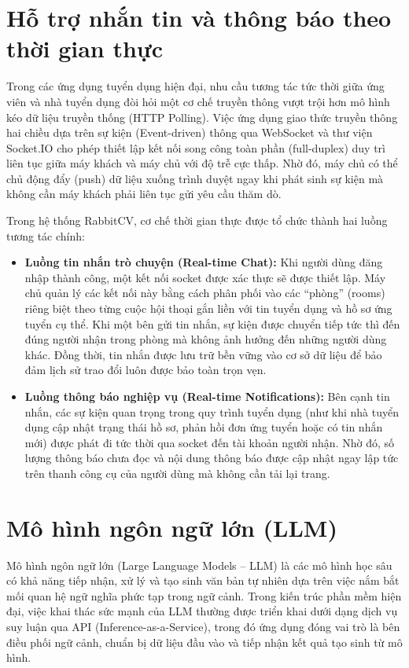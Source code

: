 \section{Hỗ trợ nhắn tin và thông báo theo thời gian thực}

Trong các ứng dụng tuyển dụng hiện đại, nhu cầu tương tác tức thời giữa ứng viên và nhà tuyển dụng đòi hỏi một cơ chế truyền thông vượt trội hơn mô hình kéo dữ liệu truyền thống (HTTP Polling). Việc ứng dụng giao thức truyền thông hai chiều dựa trên sự kiện (Event-driven) thông qua WebSocket và thư viện Socket.IO cho phép thiết lập kết nối song công toàn phần (full-duplex) duy trì liên tục giữa máy khách và máy chủ với độ trễ cực thấp. Nhờ đó, máy chủ có thể chủ động đẩy (push) dữ liệu xuống trình duyệt ngay khi phát sinh sự kiện mà không cần máy khách phải liên tục gửi yêu cầu thăm dò.

Trong hệ thống RabbitCV, cơ chế thời gian thực được tổ chức thành hai luồng tương tác chính:

\begin{itemize}
    \item \textbf{Luồng tin nhắn trò chuyện (Real-time Chat):} Khi người dùng đăng nhập thành công, một kết nối socket được xác thực sẽ được thiết lập. Máy chủ quản lý các kết nối này bằng cách phân phối vào các ``phòng'' (rooms) riêng biệt theo từng cuộc hội thoại gắn liền với tin tuyển dụng và hồ sơ ứng tuyển cụ thể. Khi một bên gửi tin nhắn, sự kiện được chuyển tiếp tức thì đến đúng người nhận trong phòng mà không ảnh hưởng đến những người dùng khác. Đồng thời, tin nhắn được lưu trữ bền vững vào cơ sở dữ liệu để bảo đảm lịch sử trao đổi luôn được bảo toàn trọn vẹn.
    \item \textbf{Luồng thông báo nghiệp vụ (Real-time Notifications):} Bên cạnh tin nhắn, các sự kiện quan trọng trong quy trình tuyển dụng (như khi nhà tuyển dụng cập nhật trạng thái hồ sơ, phản hồi đơn ứng tuyển hoặc có tin nhắn mới) được phát đi tức thời qua socket đến tài khoản người nhận. Nhờ đó, số lượng thông báo chưa đọc và nội dung thông báo được cập nhật ngay lập tức trên thanh công cụ của người dùng mà không cần tải lại trang.
\end{itemize}


\section{Mô hình ngôn ngữ lớn (LLM)}

Mô hình ngôn ngữ lớn (Large Language Models -- LLM) là các mô hình học sâu có khả năng tiếp nhận, xử lý và tạo sinh văn bản tự nhiên dựa trên việc nắm bắt mối quan hệ ngữ nghĩa phức tạp trong ngữ cảnh. Trong kiến trúc phần mềm hiện đại, việc khai thác sức mạnh của LLM thường được triển khai dưới dạng dịch vụ suy luận qua API (Inference-as-a-Service), trong đó ứng dụng đóng vai trò là bên điều phối ngữ cảnh, chuẩn bị dữ liệu đầu vào và tiếp nhận kết quả tạo sinh từ mô hình.

